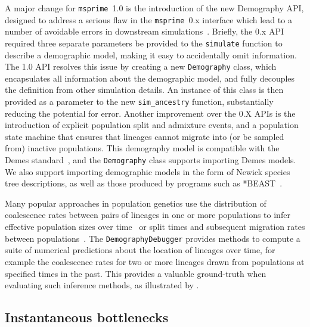 \documentclass{article}
\newcommand{\msprime}[0]{\texttt{msprime}}
\begin{document}
A major change for \msprime\ 1.0 is the introduction of the new Demography API,
designed to address a serious flaw in the \msprime\ 0.x interface which lead to
a number of avoidable errors in downstream
simulations~\citep{ragsdale2020lessons}. Briefly, the 0.x API required three
separate parameters be provided to the \texttt{simulate} function to describe a
demographic model, making it easy to accidentally omit information. The 1.0 API
resolves this issue by creating a new \texttt{Demography} class, which
encapsulates all information about the demographic model, and fully decouples
the definition from other simulation details. An instance of this class is then
provided as a parameter to the new \texttt{sim\_ancestry} function,
substantially reducing the potential for error. Another improvement over the
0.X APIs is the introduction of explicit population split and admixture events,
and a population state machine that ensures that lineages cannot migrate into
(or be sampled from) inactive populations. This demography model is compatible
with the Demes standard~\citep{gower2021demes}, and the \texttt{Demography}
class supports importing Demes models. We also support importing demographic
models in the form of Newick species tree descriptions, as well as those
produced by programs such as *BEAST~\citep{heled2009bayesian}.

Many popular approaches in population genetics use the distribution of
coalescence rates between pairs of lineages in one or more populations to infer
effective population sizes over
time~\citep{li2011inference,sheehan2013estimating,schiffels2014inferring} or
split times and subsequent migration rates between
populations~\citep{wang2020tracking}. The \texttt{DemographyDebugger} provides
methods to compute a suite of numerical predictions about the location of
lineages over time, for example the coalescence rates for two or more lineages
drawn from populations at specified times in the past. This provides a valuable
ground-truth when evaluating such inference methods, as illustrated by
\cite{adrion2020community}.

\subsection*{Instantaneous bottlenecks}
\end{document}
